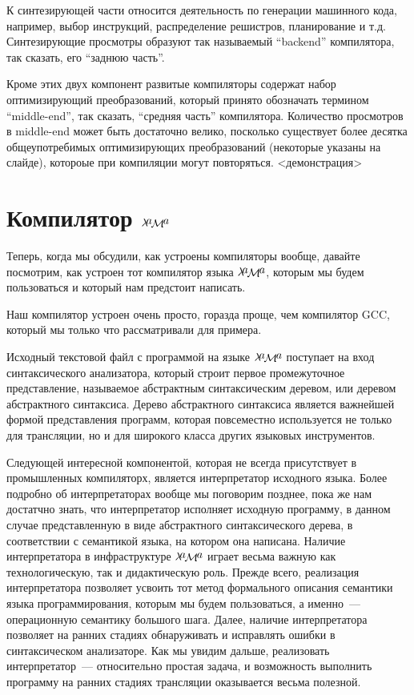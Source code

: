 \documentclass{article}
\newcommand{\lama}{$\lambda\kern -.1667em\lower -.5ex\hbox{$a$}\kern -.1000em\lower .2ex\hbox{$\mathcal M$}\kern -.1000em\lower -.5ex\hbox{$a$}$\xspace}
\begin{document}
К синтезирующей части относится деятельность по генерации машинного кода, например, выбор инструкций, распределение решистров, планирование и т.д.
Синтезирующие просмотры образуют так называемый ``backend'' компилятора, так сказать, его ``заднюю часть''.

Кроме этих двух компонент развитые компиляторы содержат набор оптимизирующий преобразований, который принято обозначать термином ``middle-end'',
так сказать, ``средняя часть'' компилятора. Количество просмотров в middle-end может быть достаточно велико, посколько существует более
десятка общеупотребимых оптимизирующих преобразований (некоторые указаны на слайде), котороые при компиляции могут повторяться.
<демонстрация>

\section{Компилятор \lama}

Теперь, когда мы обсудили, как устроены компиляторы вообще, давайте посмотрим, как устроен тот компилятор языка \lama, которым мы будем пользоваться
и который нам предстоит написать.

Наш компилятор устроен очень просто, горазда проще, чем компилятор GCC, который мы только что рассматривали для примера.

Исходный текстовой файл с программой на языке \lama поступает на вход синтаксического анализатора, который строит первое промежуточное
представление, называемое абстрактным синтаксическим деревом, или деревом абстрактного синтаксиса. Дерево абстрактного синтаксиса
является важнейшей формой представления программ, которая повсеместно используется не только для трансляции, но и для широкого
класса других языковых инструментов.

Следующей интересной компонентой, которая не всегда присутствует в промышленных компиляторх, является интерпретатор исходного языка.
Более подробно об интерпретаторах вообще мы поговорим позднее, пока же нам достатчно знать, что интерпретатор исполняет исходную программу,
в данном случае представленную в виде абстрактного синтаксического дерева, в соответствии с семантикой языка, на котором она написана.
Наличие интерпретатора в инфраструктуре \lama играет весьма важную как технологическую, так и дидактическую роль. Прежде всего,
реализация интерпретатора позволяет усвоить тот метод формального описания семантики языка программирования, которым мы будем пользоваться,
а именно~--- операционную семантику большого шага. Далее, наличие интерпретатора позволяет на ранних стадиях обнаруживать и исправлять
ошибки в синтаксическом анализаторе. Как мы увидим дальше, реализовать интерпретатор~--- относительно простая задача, и возможность
выполнить программу на ранних стадиях трансляции оказывается весьма полезной.
\end{document}
